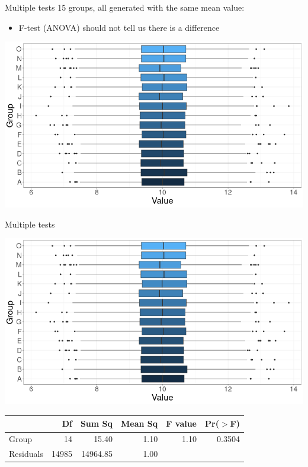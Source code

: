 \documentclass{beamer}
\begin{document}
\begin{frame}{Multiple tests}
15 groups, all generated with the same mean value:
\begin{itemize}
    \item F-test (ANOVA) should not tell us there is a difference
\end{itemize}
\begin{center}
\includegraphics[scale=0.38]{allgps.png}
\end{center}
\end{frame}

\begin{frame}{Multiple tests}
\small
\begin{center}
\includegraphics[scale=0.35]{allgps.png}
\end{center}
\begin{table}[ht]
\centering
\begin{tabular}{lrrrrr}
  \hline
 & Df & Sum Sq & Mean Sq & F value & Pr($>$F) \\ 
  \hline
Group       & 14 & 15.40 & 1.10 & 1.10 & 0.3504 \\ 
  Residuals   & 14985 & 14964.85 & 1.00 &  &  \\ 
   \hline
\end{tabular}
\end{table}

\end{frame}
\end{document}
